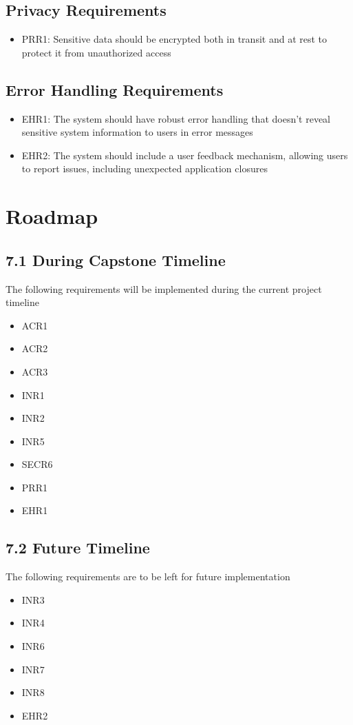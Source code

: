 \documentclass{article}
\begin{document}
\subsection{Privacy Requirements}
\begin{itemize}
    \item PRR1: Sensitive data should be encrypted both in transit and at rest to protect it from unauthorized access
\end{itemize}

\subsection{Error Handling Requirements}
\begin{itemize}
    \item EHR1: The system should have robust error handling that doesn't reveal sensitive system information to users in error messages
    \item EHR2: The system should include a user feedback mechanism, allowing users to report issues, including unexpected application closures
\end{itemize}

\section{Roadmap}

\subsection*{7.1 During Capstone Timeline}
    The following requirements will be implemented during the current project timeline
\begin{itemize}
    \item ACR1
    \item ACR2
    \item ACR3
    \item INR1
    \item INR2
    \item INR5
    \item SECR6
    \item PRR1
    \item EHR1
\end{itemize}

\subsection*{7.2 Future Timeline}
The following requirements are to be left for future implementation
\begin{itemize}
    \item INR3
    \item INR4
    \item INR6
    \item INR7
    \item INR8
    \item EHR2
\end{itemize}
\end{document}
